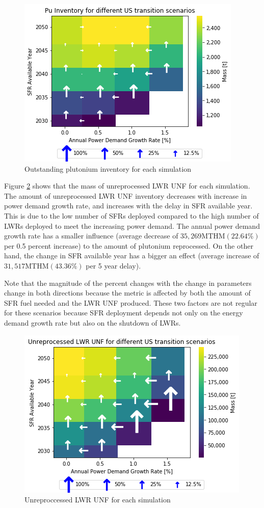 \begin{figure}[htbp!]
    \begin{center}
        \includegraphics[scale=0.7]{./images/us/scat_both_Pu_Inventory.png}
    \end{center}
        \caption{Outstanding plutonium inventory for each simulation}
    \label{fig:us_pu_inv}
\end{figure}

Figure \ref{fig:us_lwr_unf_rep} shows that the mass of unreprocessed \gls{LWR} \gls{UNF} for each simulation. 
The amount of unreprocessed \gls{LWR} \gls{UNF} inventory decreases with increase
in power demand growth rate, and increases with the delay in
\gls{SFR} available year. This is due to the low number of 
\glspl{SFR} deployed compared to the high number of \glspl{LWR} deployed to meet the increasing power demand.  The annual power demand
growth rate has a smaller influence (average decrease of $35,269 \text{MTHM} (22.64 \%)$ 
per 0.5 percent increase) to the amount of plutonium
reprocessed. On the other hand, the change in  \gls{SFR} available year
has a bigger an effect (average increase of $31,517 \text{MTHM} (43.36\%)$
per 5 year delay). 

Note that the magnitude of the percent changes with the change
in parameters change in both directions because the metric is
affected by both the amount of \gls{SFR} fuel needed and the 
\gls{LWR} \gls{UNF} produced. These two factors are not regular
for these scenarios because \gls{SFR} deployment depends not only
on the energy demand growth rate but also on the shutdown of
\glspl{LWR}.

\begin{figure}[htbp!]
    \begin{center}
        \includegraphics[scale=0.7]{./images/us/scat_both_Unreprocessed_LWR_UNF.png}
    \end{center}
        \caption{Unreproccessed \gls{LWR} \gls{UNF} for each simulation}
    \label{fig:us_lwr_unf_rep}
\end{figure}

